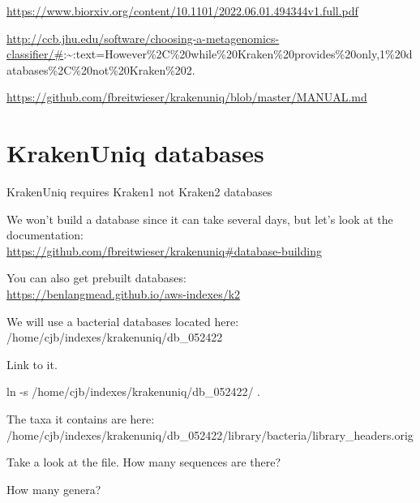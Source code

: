 \documentclass[
]{book}
\newenvironment{Shaded}{\begin{snugshade}}{\end{snugshade}}
\newcommand{\AttributeTok}[1]{\textcolor[rgb]{0.77,0.63,0.00}{#1}}
\newcommand{\FunctionTok}[1]{\textcolor[rgb]{0.00,0.00,0.00}{#1}}
\newcommand{\KeywordTok}[1]{\textcolor[rgb]{0.13,0.29,0.53}{\textbf{#1}}}
\newcommand{\NormalTok}[1]{#1}
\newcommand{\StringTok}[1]{\textcolor[rgb]{0.31,0.60,0.02}{#1}}
\begin{document}
\url{https://www.biorxiv.org/content/10.1101/2022.06.01.494344v1.full.pdf}

\url{http://ccb.jhu.edu/software/choosing-a-metagenomics-classifier/\#}:\textasciitilde:text=However\%2C\%20while\%20Kraken\%20provides\%20only,1\%20databases\%2C\%20not\%20Kraken\%202.

\url{https://github.com/fbreitwieser/krakenuniq/blob/master/MANUAL.md}

\hypertarget{krakenuniq-databases}{%
\section{KrakenUniq databases}\label{krakenuniq-databases}}

KrakenUniq requires Kraken1 not Kraken2 databases

We won't build a database since it can take several days, but let's look at the documentation:\\
\url{https://github.com/fbreitwieser/krakenuniq\#database-building}

You can also get prebuilt databases:\\
\url{https://benlangmead.github.io/aws-indexes/k2}

We will use a bacterial databases located here:\\
/home/cjb/indexes/krakenuniq/db\_052422

Link to it.

\begin{Shaded}
\begin{Highlighting}[]
\FunctionTok{ln} \AttributeTok{{-}s}\NormalTok{ /home/cjb/indexes/krakenuniq/db\_052422/ .}
\end{Highlighting}
\end{Shaded}

The taxa it contains are here:\\
/home/cjb/indexes/krakenuniq/db\_052422/library/bacteria/library\_headers.orig

Take a look at the file.
How many sequences are there?

How many genera?

\begin{Shaded}
\end{Shaded}
\end{document}
